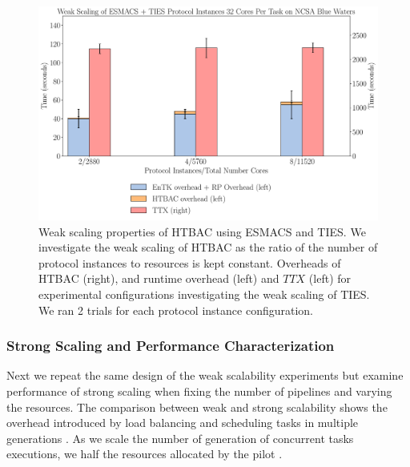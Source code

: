 \begin{figure}
  \centering
    \includegraphics[width=\columnwidth]{figures/new_ws_esmacs_ties.pdf}
    \caption{Weak scaling properties of HTBAC using ESMACS and TIES. We 
    investigate the weak scaling of HTBAC as the ratio of the number of protocol 
    instances to resources is kept constant. Overheads of HTBAC (right), and 
    runtime overhead (left) and \(TTX\) (left) for experimental configurations
    investigating the weak scaling of TIES. We ran 2 trials for each protocol
    instance configuration.}
\label{fig:weak_scaling_ESMACS_TIES}
\end{figure}



\subsubsection{Strong Scaling and Performance Characterization}


Next we repeat the same design of the weak scalability experiments but
examine performance of strong scaling when fixing the number of pipelines and
varying the resources. The comparison between weak and strong scalability
shows the overhead introduced by load balancing and scheduling tasks in
multiple generations . As we scale the number of generation of concurrent tasks
executions, we half the resources allocated by the pilot .

